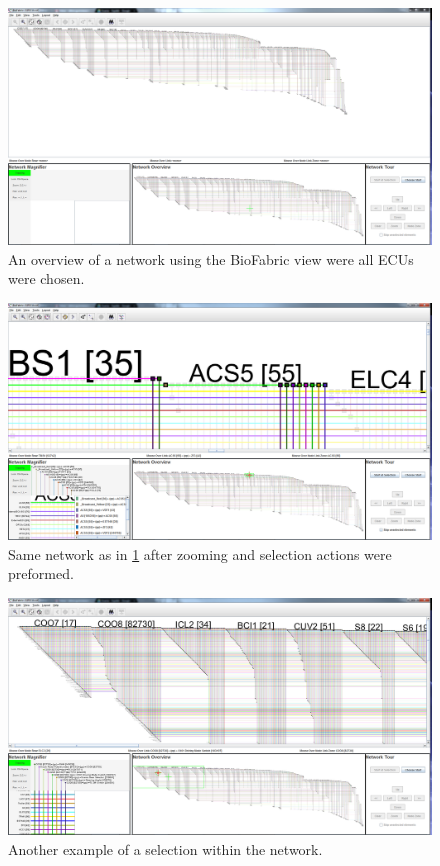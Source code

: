 \documentclass[a4paper,11pt]{kth-mag}
\begin{document}
\begin{figure}[!htbp]
	\centering
	\includegraphics[scale=0.3]{SesammVisualAppPics/BioFabric/Undirected/ECU/AllaECU1}
	\caption{An overview of a network using the BioFabric view were all ECUs were chosen.}
	\label{fig:AllaECU1BIO}
\end{figure}

 \newpage
\begin{figure}[!htbp]
	\centering
	\includegraphics[scale=0.3]{SesammVisualAppPics/BioFabric/Undirected/ECU/AllaECU2}
	\caption{Same network as in \ref{fig:AllaECU1BIO} after zooming and selection actions were preformed.}
	\label{fig:AllaECU2BIO}
\end{figure}

\begin{figure}[!htbp]
	\centering
	\includegraphics[scale=0.3]{SesammVisualAppPics/BioFabric/Undirected/ECU/AllaECU3}
	\caption{Another example of a selection within the network.}
	\label{fig:AllaECU3BIO}
\end{figure}
 
\end{document}
